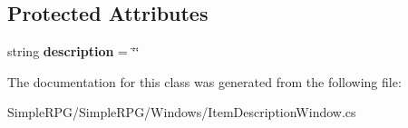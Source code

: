 \subsection*{Protected Attributes}
\begin{DoxyCompactItemize}
\item 
\hypertarget{class_simple_r_p_g_1_1_windows_1_1_item_description_window_ac9367e28041ff7f0bfa406bd8d3e49b3}{string {\bfseries description} = \char`\"{}\char`\"{}}\label{class_simple_r_p_g_1_1_windows_1_1_item_description_window_ac9367e28041ff7f0bfa406bd8d3e49b3}

\end{DoxyCompactItemize}


The documentation for this class was generated from the following file\-:\begin{DoxyCompactItemize}
\item 
Simple\-R\-P\-G/\-Simple\-R\-P\-G/\-Windows/Item\-Description\-Window.\-cs\end{DoxyCompactItemize}
